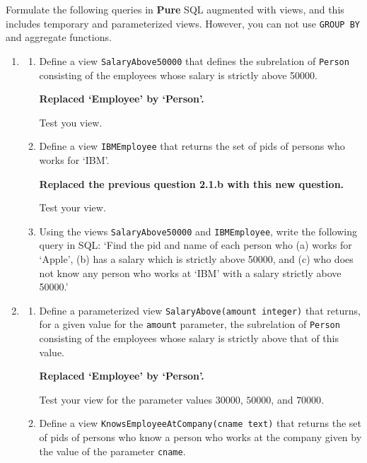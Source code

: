 Formulate the following queries in {\bf Pure} SQL augmented with
views,  and this includes temporary and parameterized views.
However, you can not use  {\tt GROUP BY} and aggregate functions.

\begin{enumerate}
\item  \label{viewone}  
\begin{enumerate} 
\item Define a view {\tt SalaryAbove50000} that defines the subrelation of
{\tt Person} consisting of the employees whose salary is strictly above 50000.

{\bf Replaced `Employee' by `Person'.}

Test you view.


\item   Define a view {\tt IBMEmployee} that returns the set of pids of persons
who works for `IBM'.

{\bf Replaced the previous question 2.1.b with this new question.}

Test your view.

\item Using the views {\tt SalaryAbove50000} and {\tt IBMEmployee}, write the
following query in SQL:  `Find the pid and name of each person who (a) works for `Apple', (b) has a salary which
is strictly above 50000, and (c) who does not know any 
person who works at `IBM' with a salary strictly above 50000.'
\end{enumerate}

\item  \label{viewone}  
\begin{enumerate} 
\item Define a parameterized view {\tt SalaryAbove(amount integer)} that returns, for a given
value for the {\tt amount} parameter, the subrelation of
{\tt Person} consisting of the employees whose salary is strictly above that of this value.

{\bf Replaced `Employee' by `Person'.}


Test your view for the parameter values $30000$, $50000$, and $70000$.

\item Define a view {\tt KnowsEmployeeAtCompany(cname text)} that returns the set of pids of persons
who know a person who works at the company given by the value of the parameter {\tt cname}.


\end{enumerate}
\end{enumerate}
